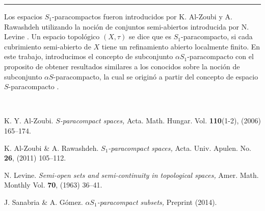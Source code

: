 \begin{titlepage}
\begin{minipage}{0.5\linewidth}
\begin{minipage}{0.45\linewidth}
    \begin{flushright}
        \printauthor
    \end{flushright}
\end{minipage} \hspace{0pt}
%
\begin{minipage}{0.02\linewidth}
      \color{ptctitle} \rule{1pt}{175pt}
\end{minipage} 
\end{minipage}
\hspace*{-4.5cm}
%
\begin{minipage}{0.85\linewidth}
\begin{minipage}{0.85\linewidth}
\footnotesize
\vspace{5pt}
    \begin{resumen}     
Los espacios $S_1$-paracompactos fueron introducidos por K. Al-Zoubi y A. Rawashdeh \cite{alra} utilizando la noci\'{o}n de conjuntos semi-abiertos introducida por N. Levine \cite{le}. Un espacio topol\'{o}gico $(X,\tau)$ se dice que es $S_1$-paracompacto, si cada cubrimiento semi-abierto de $X$ tiene un refinamiento abierto localmente finito. En este trabajo, introducimos el concepto de subconjunto $\alpha S_1$-paracompacto con el proposito de obtener resultados similares a los conocidos sobre la noci\'{o}n de subconjunto $\alpha S$-paracompacto, la cual se origin\'{o} a partir del concepto de espacio $S$-paracompacto \cite{al}.
    \end{resumen}
   \end{minipage}
   \vspace{10pt}
\end{minipage}
\vspace{10pt}\\[5pt]
\begin{thebibliography}{99}
  K. Y. Al-Zoubi.
 \textit{$S$-paracompact spaces,} Acta. Math.
Hungar. Vol. {\bf 110}(1-2), (2006) 165--174.

  K. Al-Zoubi \& A. Rawashdeh.
\textit{$S_1$-paracompact spaces,} Acta. Univ.
Apulen. No. {\bf 26}, (2011) 105--112.

 N. Levine.
\textit{Semi-open sets and semi-continuity in topological spaces,} Amer. Math.
Monthly Vol. {\bf 70}, (1963) 36--41.


 J. Sanabria \& A. G\'omez.
\textit{$\alpha S_1$-paracompact subsets,} Preprint (2014).
\end{thebibliography}
\end{titlepage}

